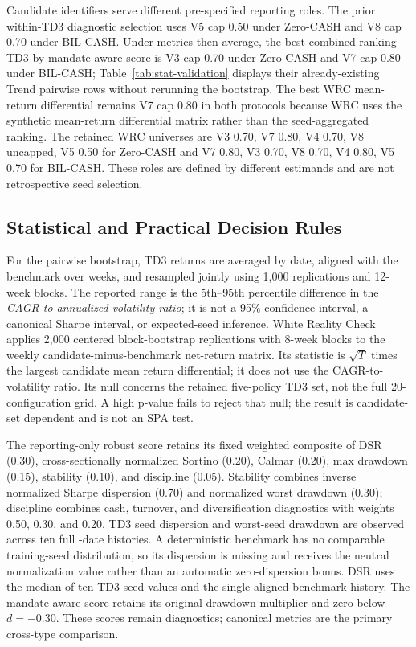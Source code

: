 \documentclass[11pt]{article}
\newcommand{\cashzero}{Zero-CASH}
\newcommand{\cashbil}{BIL-CASH}
\begin{document}
Candidate identifiers serve different pre-specified reporting roles. The prior within-TD3 diagnostic selection uses V5 cap 0.50 under \cashzero{} and V8 cap 0.70 under \cashbil{}. Under metrics-then-average, the best combined-ranking TD3 by mandate-aware score is V3 cap 0.70 under \cashzero{} and V7 cap 0.80 under \cashbil{}; Table~\ref{tab:stat-validation} displays their already-existing Trend pairwise rows without rerunning the bootstrap. The best WRC mean-return differential remains V7 cap 0.80 in both protocols because WRC uses the synthetic mean-return differential matrix rather than the seed-aggregated ranking. The retained WRC universes are {V3 0.70, V7 0.80, V4 0.70, V8 uncapped, V5 0.50} for \cashzero{} and {V7 0.80, V3 0.70, V8 0.70, V4 0.80, V5 0.70} for \cashbil{}. These roles are defined by different estimands and are not retrospective seed selection.

\subsection{Statistical and Practical Decision Rules}

For the pairwise bootstrap, TD3 returns are averaged by date, aligned with the benchmark over \AlignedWeeks{} weeks, and resampled jointly using 1,000 replications and 12-week blocks. The reported range is the 5th--95th percentile difference in the \emph{CAGR-to-annualized-volatility ratio}; it is not a 95\% confidence interval, a canonical Sharpe interval, or expected-seed inference. White Reality Check applies 2,000 centered block-bootstrap replications with 8-week blocks to the weekly candidate-minus-benchmark net-return matrix. Its statistic is $\sqrt{T}$ times the largest candidate mean return differential; it does not use the CAGR-to-volatility ratio. Its null concerns the retained five-policy TD3 set, not the full 20-configuration grid. A high p-value fails to reject that null; the result is candidate-set dependent and is not an SPA test.

The reporting-only robust score retains its fixed weighted composite of DSR (0.30), cross-sectionally normalized Sortino (0.20), Calmar (0.20), max drawdown (0.15), stability (0.10), and discipline (0.05). Stability combines inverse normalized Sharpe dispersion (0.70) and normalized worst drawdown (0.30); discipline combines cash, turnover, and diversification diagnostics with weights 0.50, 0.30, and 0.20. TD3 seed dispersion and worst-seed drawdown are observed across ten full \AlignedWeeks{}-date histories. A deterministic benchmark has no comparable training-seed distribution, so its dispersion is missing and receives the neutral normalization value rather than an automatic zero-dispersion bonus. DSR uses the median of ten TD3 seed values and the single aligned benchmark history. The mandate-aware score retains its original drawdown multiplier and zero below $d=-0.30$. These scores remain diagnostics; canonical metrics are the primary cross-type comparison.
\end{document}

